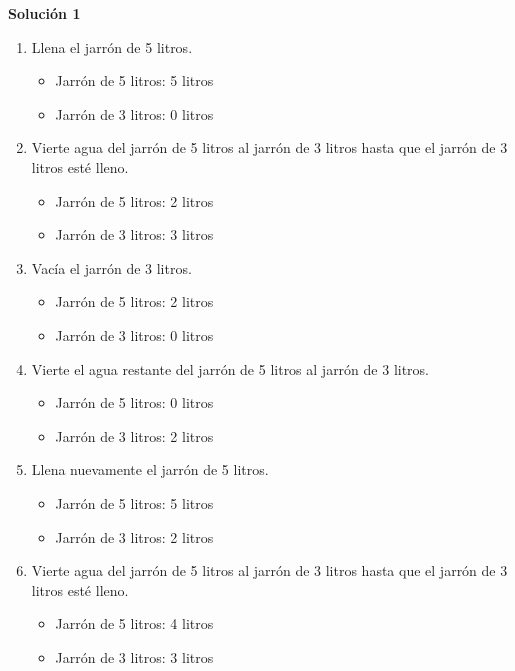 \textbf{Solución 1}
\begin{enumerate} 
    \item Llena el jarrón de 5 litros. 
    \begin{itemize} 
        \item Jarrón de 5 litros: 5 litros 
        \item Jarrón de 3 litros: 0 litros 
    \end{itemize} 
    \item Vierte agua del jarrón de 5 litros al jarrón de 3 litros hasta que el jarrón de 3 litros esté lleno. 
    \begin{itemize} 
        \item Jarrón de 5 litros: 2 litros 
        \item Jarrón de 3 litros: 3 litros 
    \end{itemize} 
    \item Vacía el jarrón de 3 litros. 
    \begin{itemize} 
        \item Jarrón de 5 litros: 2 litros 
        \item Jarrón de 3 litros: 0 litros 
    \end{itemize} 
    \item Vierte el agua restante del jarrón de 5 litros al jarrón de 3 litros. 
    \begin{itemize} 
        \item Jarrón de 5 litros: 0 litros
        \item Jarrón de 3 litros: 2 litros 
    \end{itemize} 
    \item Llena nuevamente el jarrón de 5 litros. 
    \begin{itemize} 
        \item Jarrón de 5 litros: 5 litros 
        \item Jarrón de 3 litros: 2 litros 
    \end{itemize} 
    \item Vierte agua del jarrón de 5 litros al jarrón de 3 litros hasta que el jarrón de 3 litros esté lleno. 
    \begin{itemize} 
        \item Jarrón de 5 litros: 4 litros 
        \item Jarrón de 3 litros: 3 litros 
    \end{itemize} 
\end{enumerate}

